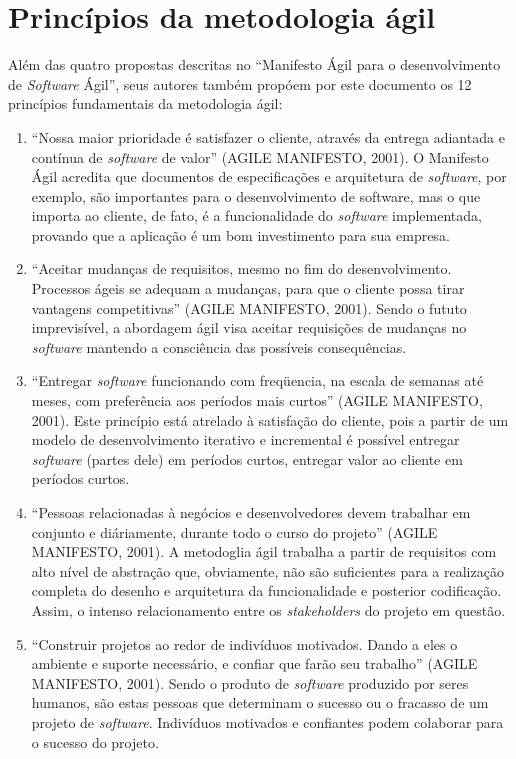 \section{Princípios da metodologia ágil}
Além das quatro propostas descritas no “Manifesto Ágil para o desenvolvimento de \textit{Software} Ágil”, seus autores também propóem por este documento os 12 princípios fundamentais da metodologia ágil:
\begin{enumerate}
	\item “Nossa maior prioridade é satisfazer o cliente, através da entrega adiantada e contínua de \textit{software} de valor” (AGILE MANIFESTO, 2001). O Manifesto Ágil acredita que documentos de especificações e arquitetura de \textit{software}, por exemplo, são importantes para o desenvolvimento de software, mas o que importa ao cliente, de fato, é a funcionalidade do \textit{software} implementada, provando que a aplicação é um bom investimento para sua empresa.
	\item “Aceitar mudanças de requisitos, mesmo no fim do desenvolvimento. Processos ágeis se adequam a mudanças, para que o cliente possa tirar vantagens competitivas” (AGILE MANIFESTO, 2001). Sendo o fututo imprevisível, a abordagem ágil visa aceitar requisições de mudanças no \textit{software} mantendo a consciência das possíveis consequências.
	\item “Entregar \textit{software} funcionando com freqüencia, na escala de semanas até meses, com preferência aos períodos mais curtos” (AGILE MANIFESTO, 2001). Este princípio está atrelado à satisfação do cliente, pois a partir de um modelo de desenvolvimento iterativo e incremental é possível entregar \textit{software} (partes dele) em períodos curtos, entregar valor ao cliente em períodos curtos.
	\item “Pessoas relacionadas à negócios e desenvolvedores devem trabalhar em conjunto e diáriamente, durante todo o curso do projeto” (AGILE MANIFESTO, 2001). A metodoglia ágil trabalha a partir de requisitos com alto nível de abstração que, obviamente, não são suficientes para a realização completa do desenho e arquitetura da funcionalidade e posterior codificação. Assim, o intenso relacionamento entre os \textit{stakeholders} do projeto em questão.
	\item “Construir projetos ao redor de indivíduos motivados. Dando a eles o ambiente e suporte necessário, e confiar que farão seu trabalho” (AGILE MANIFESTO, 2001). Sendo o produto de \textit{software} produzido por seres humanos, são estas pessoas que determinam o sucesso ou o fracasso de um projeto de \textit{software}. Indivíduos motivados e confiantes podem colaborar para o sucesso do projeto.

\end{enumerate}
